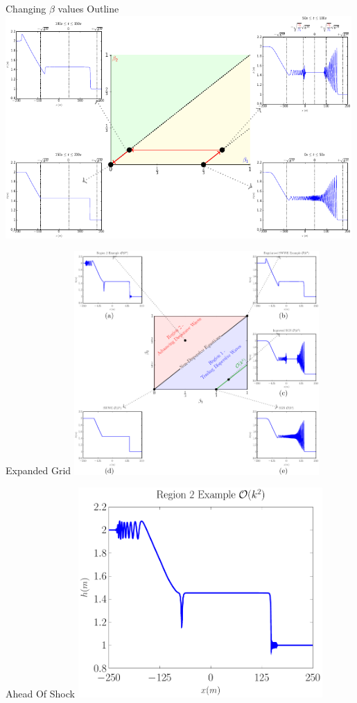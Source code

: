 \documentclass[pdf]{beamer}
\begin{document}
\begin{frame}{Changing $\beta$ values Outline}
\centering
\includegraphics[width=0.99\textwidth]{./Pics/Tex/Explanatory/RegDBV/3x3Grid.pdf}
\end{frame}

\begin{frame}[plain]{}
\end{frame}

\begin{frame}{Expanded Grid}
\centering
\includegraphics[width=0.7\textwidth]{3x3GridAhead.pdf}
\end{frame}

\begin{frame}{Ahead Of Shock}
\centering
\includegraphics[width=0.7\textwidth]{hEx04.pdf}
\end{frame}
\end{document}
